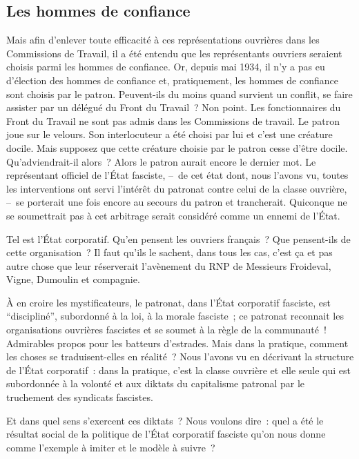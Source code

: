 \documentclass[french,twoside]{book} %
\begin{document}
\subsection[Les hommes de confiance]{Les hommes de confiance}
\noindent Mais afin d’enlever toute efficacité à ces représentations ouvrières dans les Commissions de Travail, il a été entendu que les représentants ouvriers seraient choisis parmi les hommes de confiance. Or, depuis mai 1934, il n’y a pas eu d’élection des hommes de confiance et, pratiquement, les hommes de confiance sont choisis par le patron. Peuvent-ils du moins quand survient un conflit, se faire assister par un délégué du Front du Travail ? Non point. Les fonctionnaires du Front du Travail ne sont pas admis dans les Commissions de travail. Le patron joue sur le velours. Son interlocuteur a été choisi par lui et c’est une créature docile. Mais supposez que cette créature choisie par le patron cesse d’être docile. Qu’adviendrait-il alors ? Alors le patron aurait encore le dernier mot. Le représentant officiel de l’État fasciste, – de cet état dont, nous l’avons vu, toutes les interventions ont servi l’intérêt du patronat contre celui de la classe ouvrière, – se porterait une fois encore au secours du patron et trancherait. Quiconque ne se soumettrait pas à cet arbitrage serait considéré comme un ennemi de l’État.\par
Tel est l’État corporatif. Qu’en pensent les ouvriers français ? Que pensent-ils de cette organisation ? Il faut qu’ils le sachent, dans tous les cas, c’est ça et pas autre chose que leur réserverait l’avènement du RNP de Messieurs Froideval, Vigne, Dumoulin et compagnie.\par
À en croire les mystificateurs, le patronat, dans l’État corporatif fasciste, est “discipliné”, subordonné à la loi, à la morale fasciste ; ce patronat reconnait les organisations ouvrières fascistes et se soumet à la règle de la communauté ! Admirables propos pour les batteurs d’estrades. Mais dans la pratique, comment les choses se traduisent-elles en réalité ? Nous l’avons vu en décrivant la structure de l’État corporatif : dans la pratique, c’est la classe ouvrière et elle seule qui est subordonnée à la volonté et aux diktats du capitalisme patronal par le truchement des syndicats fascistes.\par
Et dans quel sens s’exercent ces diktats ? Nous voulons dire : quel a été le résultat social de la politique de l’État corporatif fasciste qu’on nous donne comme l’exemple à imiter et le modèle à suivre ?
\end{document}

